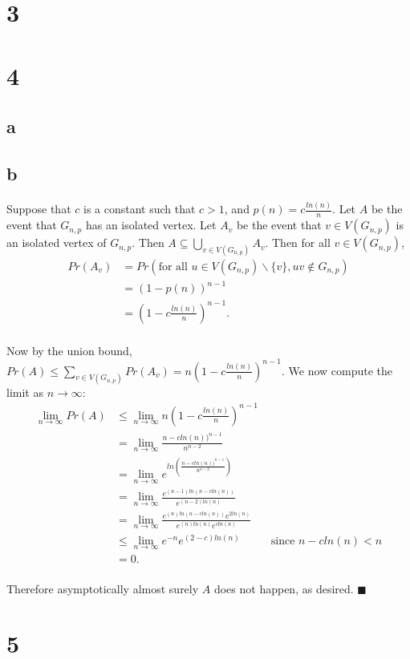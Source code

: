 \documentclass[letterpaper,12pt,oneside,onecolumn]{report}
\begin{document}
\section*{3}

\section*{4}
\subsection*{a}

\subsection*{b}
\paragraph{}
Suppose that $c$ is a constant such that $c > 1$, and $p(n) = c\frac{ln(n)}{n}$. Let $A$ be the event that $G_{n,p}$ has an isolated vertex. Let $A_v$ be the event that $v \in V(G_{n,p})$ is an isolated vertex of $G_{n,p}$. Then $A \subseteq \bigcup_{v \in V(G_{n,p})} A_v$. Then for all $v \in V(G_{n,p})$,
\begin{align*}
Pr(A_v) &= Pr(\text{for all } u \in V(G_{n,p})\backslash \{v\}, uv \not\in G_{n,p}) \\
&= (1- p(n))^{n-1} \\
&= (1- c\frac{ln(n)}{n})^{n-1}.
\end{align*}
\paragraph{}
Now by the union bound, $Pr(A) \leq \sum_{v\in V(G_{n,p})} Pr(A_v) = n(1- c\frac{ln(n)}{n})^{n-1}$. We now compute the limit as $n \rightarrow \infty$:
\begin{align*}
\lim_{n \to \infty} Pr(A) &\leq \lim_{n\to \infty} n(1- c\frac{ln(n)}{n})^{n-1} \\
&= \lim_{n\to \infty} \frac{n-cln(n))^{n-1}}{n^{n-2}} \\
&=  \lim_{n\to \infty} e^{ln(\frac{n-cln(n))^{n-1}}{n^{n-2}})} \\
&=  \lim_{n\to \infty} \frac{e^{(n-1)ln(n - cln(n))}}{e^{(n-2)ln(n)}}\\
&=  \lim_{n\to \infty} \frac{e^{(n)ln(n - cln(n))}e^{2ln(n)}}{e^{(n)ln(n)}e^{cln(n)}}\\
&\leq \lim_{n\to \infty} e^{-n}e^{(2-c)ln(n)} &\text{ since $n-cln(n) < n$} \\
& = 0.
\end{align*}
\paragraph{}
Therefore asymptotically almost surely $A$ does not happen, as desired. $\blacksquare$
\section*{5}
\end{document}
